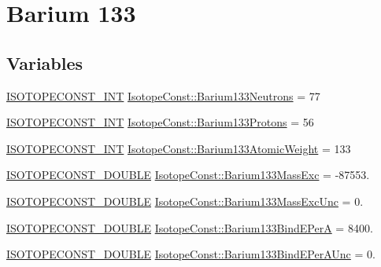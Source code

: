 \hypertarget{group___isotope_const-_barium-_ba133}{}\section{Barium 133}
\label{group___isotope_const-_barium-_ba133}
\subsection*{Variables}
\begin{DoxyCompactItemize}
\item 
\mbox{\hyperlink{group___isotope_const-_macros_ga5f18360b3e99483a35c32d789e62621c}{I\+S\+O\+T\+O\+P\+E\+C\+O\+N\+S\+T\+\_\+\+I\+NT}} \mbox{\hyperlink{group___isotope_const-_barium-_ba133_ga91b82c9fd463be37d558cae0a3e64b0e}{Isotope\+Const\+::\+Barium133\+Neutrons}} = 77
\item 
\mbox{\hyperlink{group___isotope_const-_macros_ga5f18360b3e99483a35c32d789e62621c}{I\+S\+O\+T\+O\+P\+E\+C\+O\+N\+S\+T\+\_\+\+I\+NT}} \mbox{\hyperlink{group___isotope_const-_barium-_ba133_ga11f104e50b043f6fa6ef399f61146623}{Isotope\+Const\+::\+Barium133\+Protons}} = 56
\item 
\mbox{\hyperlink{group___isotope_const-_macros_ga5f18360b3e99483a35c32d789e62621c}{I\+S\+O\+T\+O\+P\+E\+C\+O\+N\+S\+T\+\_\+\+I\+NT}} \mbox{\hyperlink{group___isotope_const-_barium-_ba133_ga7a64456b83ce885396f45e0763b25b70}{Isotope\+Const\+::\+Barium133\+Atomic\+Weight}} = 133
\item 
\mbox{\hyperlink{group___isotope_const-_macros_ga8f45a7272ce02c0b4c65c44636ed719a}{I\+S\+O\+T\+O\+P\+E\+C\+O\+N\+S\+T\+\_\+\+D\+O\+U\+B\+LE}} \mbox{\hyperlink{group___isotope_const-_barium-_ba133_ga21409f1e2078695afe4258af3d0657db}{Isotope\+Const\+::\+Barium133\+Mass\+Exc}} = -\/87553.
\item 
\mbox{\hyperlink{group___isotope_const-_macros_ga8f45a7272ce02c0b4c65c44636ed719a}{I\+S\+O\+T\+O\+P\+E\+C\+O\+N\+S\+T\+\_\+\+D\+O\+U\+B\+LE}} \mbox{\hyperlink{group___isotope_const-_barium-_ba133_ga7b00547140d8fb0587931d21cc3af1a2}{Isotope\+Const\+::\+Barium133\+Mass\+Exc\+Unc}} = 0.
\item 
\mbox{\hyperlink{group___isotope_const-_macros_ga8f45a7272ce02c0b4c65c44636ed719a}{I\+S\+O\+T\+O\+P\+E\+C\+O\+N\+S\+T\+\_\+\+D\+O\+U\+B\+LE}} \mbox{\hyperlink{group___isotope_const-_barium-_ba133_ga44a1c1d4c4521bf7be2df912939cae64}{Isotope\+Const\+::\+Barium133\+Bind\+E\+PerA}} = 8400.
\item 
\mbox{\hyperlink{group___isotope_const-_macros_ga8f45a7272ce02c0b4c65c44636ed719a}{I\+S\+O\+T\+O\+P\+E\+C\+O\+N\+S\+T\+\_\+\+D\+O\+U\+B\+LE}} \mbox{\hyperlink{group___isotope_const-_barium-_ba133_ga158b507c466d184ea65e3cb6d1aed5df}{Isotope\+Const\+::\+Barium133\+Bind\+E\+Per\+A\+Unc}} = 0.

\end{DoxyCompactItemize}
